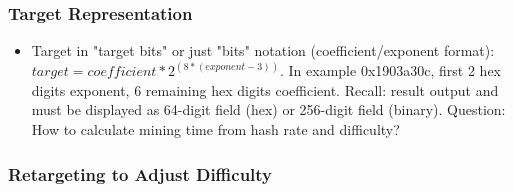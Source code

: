 \documentclass[english, 11pt]{article}
\begin{document}
\subsubsection{Target Representation}
\begin{itemize}
    \item Target in "target bits" or just "bits" notation (coefficient/exponent format): \(target = coefficient * 2^{(8*(exponent-3))}\). In example 0x1903a30c, first 2 hex digits exponent, 6 remaining hex digits coefficient. Recall: result output and must be displayed as 64-digit field (hex) or 256-digit field (binary). Question: How to calculate mining time from hash rate and difficulty?
\end{itemize}
\subsubsection{Retargeting to Adjust Difficulty}
\end{document}
